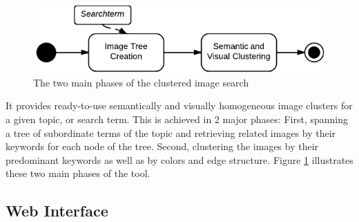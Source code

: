 \begin{figure}[h]
\centering
\includegraphics[]{images/search_process_highlevel.pdf}
\caption{The two main phases of the clustered image search}
\label{fig_overallprocess}
\end{figure}

It provides ready-to-use semantically and visually homogeneous image clusters for a given topic, or search term. This is achieved in 2 major phases: First, spanning a tree of subordinate terms of the topic and retrieving related images by their keywords for each node of the tree. Second, clustering the images by their predominant keywords as well as by colors and edge structure. Figure \ref{fig_overallprocess} illustrates these two main phases of the tool.

\subsection{Web Interface}

